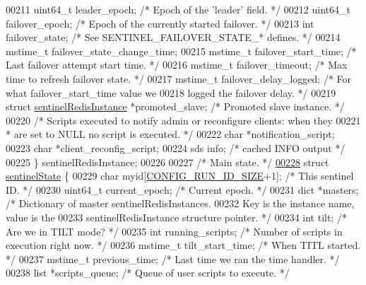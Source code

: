 \begin{DoxyCode}
00211     uint64\_t leader\_epoch; \textcolor{comment}{/* Epoch of the 'leader' field. */}
00212     uint64\_t failover\_epoch; \textcolor{comment}{/* Epoch of the currently started failover. */}
00213     \textcolor{keywordtype}{int} failover\_state; \textcolor{comment}{/* See SENTINEL\_FAILOVER\_STATE\_* defines. */}
00214     mstime\_t failover\_state\_change\_time;
00215     mstime\_t failover\_start\_time;   \textcolor{comment}{/* Last failover attempt start time. */}
00216     mstime\_t failover\_timeout;      \textcolor{comment}{/* Max time to refresh failover state. */}
00217     mstime\_t failover\_delay\_logged; \textcolor{comment}{/* For what failover\_start\_time value we}
00218 \textcolor{comment}{                                       logged the failover delay. */}
00219     \textcolor{keyword}{struct} \hyperlink{structsentinelRedisInstance}{sentinelRedisInstance} *promoted\_slave; \textcolor{comment}{/* Promoted slave instance. */}
00220     \textcolor{comment}{/* Scripts executed to notify admin or reconfigure clients: when they}
00221 \textcolor{comment}{     * are set to NULL no script is executed. */}
00222     \textcolor{keywordtype}{char} *notification\_script;
00223     \textcolor{keywordtype}{char} *client\_reconfig\_script;
00224     sds info; \textcolor{comment}{/* cached INFO output */}
00225 \} sentinelRedisInstance;
00226 
00227 \textcolor{comment}{/* Main state. */}
\hyperlink{structsentinelState}{00228} \textcolor{keyword}{struct} \hyperlink{structsentinelState}{sentinelState} \{
00229     \textcolor{keywordtype}{char} myid[\hyperlink{server_8h_aba6794fa3ee28f85165eaed93190f1df}{CONFIG\_RUN\_ID\_SIZE}+1]; \textcolor{comment}{/* This sentinel ID. */}
00230     uint64\_t current\_epoch;         \textcolor{comment}{/* Current epoch. */}
00231     dict *masters;      \textcolor{comment}{/* Dictionary of master sentinelRedisInstances.}
00232 \textcolor{comment}{                           Key is the instance name, value is the}
00233 \textcolor{comment}{                           sentinelRedisInstance structure pointer. */}
00234     \textcolor{keywordtype}{int} tilt;           \textcolor{comment}{/* Are we in TILT mode? */}
00235     \textcolor{keywordtype}{int} running\_scripts;    \textcolor{comment}{/* Number of scripts in execution right now. */}
00236     mstime\_t tilt\_start\_time;       \textcolor{comment}{/* When TITL started. */}
00237     mstime\_t previous\_time;         \textcolor{comment}{/* Last time we ran the time handler. */}
00238     list *scripts\_queue;            \textcolor{comment}{/* Queue of user scripts to execute. */}

\end{DoxyCode}

